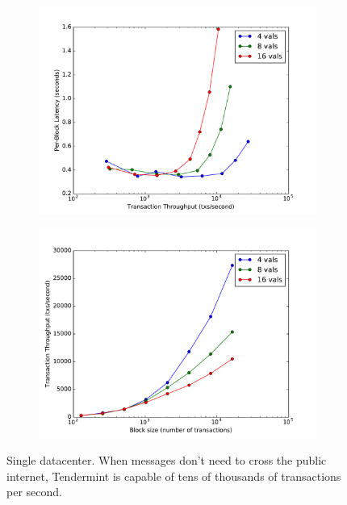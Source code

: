 \begin{figure}[]
	\centering
	\begin{subfigure}{0.8 \textwidth}
		\includegraphics[width=\linewidth,height=\textheight,keepaspectratio]{figures/throughput/single_datacenter/latency-throughput.pdf}
		\centering
	\end{subfigure}

	\begin{subfigure}{0.8 \textwidth}
		\includegraphics[width=\linewidth,height=\textheight,keepaspectratio]{figures/throughput/single_datacenter/throughput-blocksize.pdf}
	\end{subfigure}
	\caption[Latency-throughput tradeoff in non-faulty local network]{Single datacenter.
When messages don't need to cross the public internet, Tendermint is capable of tens of thousands of transactions per second.}
	\label{fig:exp:throughput:single}
\end{figure}



